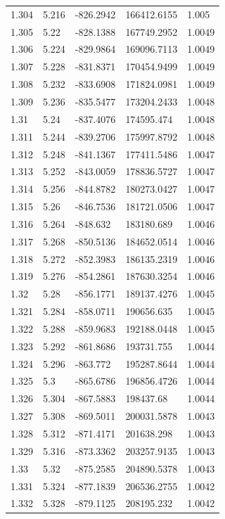 \begin{tabular}{lllll}
1.304 & 5.216 & -826.2942 & 166412.6155 & 1.005 \\
1.305 & 5.22 & -828.1388 & 167749.2952 & 1.0049 \\
1.306 & 5.224 & -829.9864 & 169096.7113 & 1.0049 \\
1.307 & 5.228 & -831.8371 & 170454.9499 & 1.0049 \\
1.308 & 5.232 & -833.6908 & 171824.0981 & 1.0049 \\
1.309 & 5.236 & -835.5477 & 173204.2433 & 1.0048 \\
1.31 & 5.24 & -837.4076 & 174595.474 & 1.0048 \\
1.311 & 5.244 & -839.2706 & 175997.8792 & 1.0048 \\
1.312 & 5.248 & -841.1367 & 177411.5486 & 1.0047 \\
1.313 & 5.252 & -843.0059 & 178836.5727 & 1.0047 \\
1.314 & 5.256 & -844.8782 & 180273.0427 & 1.0047 \\
1.315 & 5.26 & -846.7536 & 181721.0506 & 1.0047 \\
1.316 & 5.264 & -848.632 & 183180.689 & 1.0046 \\
1.317 & 5.268 & -850.5136 & 184652.0514 & 1.0046 \\
1.318 & 5.272 & -852.3983 & 186135.2319 & 1.0046 \\
1.319 & 5.276 & -854.2861 & 187630.3254 & 1.0046 \\
1.32 & 5.28 & -856.1771 & 189137.4276 & 1.0045 \\
1.321 & 5.284 & -858.0711 & 190656.635 & 1.0045 \\
1.322 & 5.288 & -859.9683 & 192188.0448 & 1.0045 \\
1.323 & 5.292 & -861.8686 & 193731.755 & 1.0044 \\
1.324 & 5.296 & -863.772 & 195287.8644 & 1.0044 \\
1.325 & 5.3 & -865.6786 & 196856.4726 & 1.0044 \\
1.326 & 5.304 & -867.5883 & 198437.68 & 1.0044 \\
1.327 & 5.308 & -869.5011 & 200031.5878 & 1.0043 \\
1.328 & 5.312 & -871.4171 & 201638.298 & 1.0043 \\
1.329 & 5.316 & -873.3362 & 203257.9135 & 1.0043 \\
1.33 & 5.32 & -875.2585 & 204890.5378 & 1.0043 \\
1.331 & 5.324 & -877.1839 & 206536.2755 & 1.0042 \\
1.332 & 5.328 & -879.1125 & 208195.232 & 1.0042 \\

\end{tabular}
